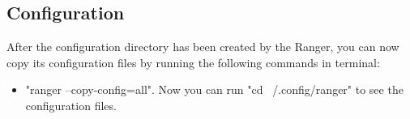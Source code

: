 \subsection{Configuration}
After the configuration directory has been created by the Ranger, you can now copy its configuration files by running the following commands in terminal:
\begin{itemize}
    \item "ranger --copy-config=all". Now you can run "cd ~/.config/ranger" to see the
        configuration files.
\end{itemize}


